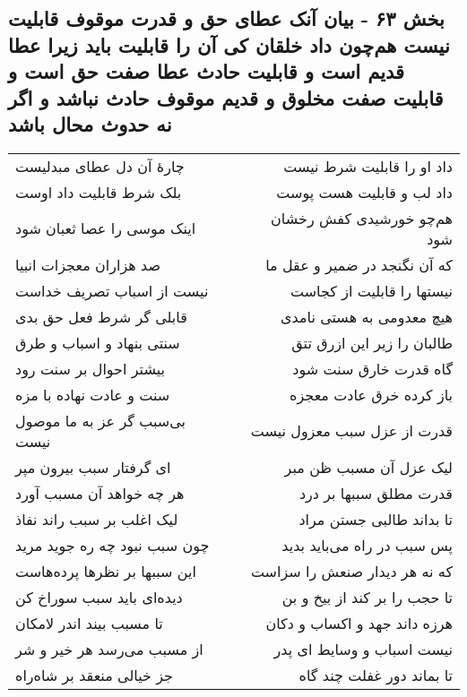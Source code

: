 \begin{center}
\section*{بخش ۶۳ - بیان آنک عطای حق و قدرت موقوف قابلیت نیست هم‌چون داد خلقان کی آن را قابلیت باید  زیرا عطا قدیم است و قابلیت حادث عطا صفت حق است و قابلیت صفت مخلوق و قدیم موقوف حادث نباشد و اگر نه حدوث محال باشد}
\label{sec:sh063}
\begin{longtable}{l p{0.5cm} r}
چارهٔ آن دل عطای مبدلیست
&&
داد او را قابلیت شرط نیست
\\
بلک شرط قابلیت داد اوست
&&
داد لب و قابلیت هست پوست
\\
اینک موسی را عصا ثعبان شود
&&
هم‌چو خورشیدی کفش رخشان شود
\\
صد هزاران معجزات انبیا
&&
که آن نگنجد در ضمیر و عقل ما
\\
نیست از اسباب تصریف خداست
&&
نیستها را قابلیت از کجاست
\\
قابلی گر شرط فعل حق بدی
&&
هیچ معدومی به هستی نامدی
\\
سنتی بنهاد و اسباب و طرق
&&
طالبان را زیر این ازرق تتق
\\
بیشتر احوال بر سنت رود
&&
گاه قدرت خارق سنت شود
\\
سنت و عادت نهاده با مزه
&&
باز کرده خرق عادت معجزه
\\
بی‌سبب گر عز به ما موصول نیست
&&
قدرت از عزل سبب معزول نیست
\\
ای گرفتار سبب بیرون مپر
&&
لیک عزل آن مسبب ظن مبر
\\
هر چه خواهد آن مسبب آورد
&&
قدرت مطلق سببها بر درد
\\
لیک اغلب بر سبب راند نفاذ
&&
تا بداند طالبی جستن مراد
\\
چون سبب نبود چه ره جوید مرید
&&
پس سبب در راه می‌باید بدید
\\
این سببها بر نظرها پرده‌هاست
&&
که نه هر دیدار صنعش را سزاست
\\
دیده‌ای باید سبب سوراخ کن
&&
تا حجب را بر کند از بیخ و بن
\\
تا مسبب بیند اندر لامکان
&&
هرزه داند جهد و اکساب و دکان
\\
از مسبب می‌رسد هر خیر و شر
&&
نیست اسباب و وسایط ای پدر
\\
جز خیالی منعقد بر شاه‌راه
&&
تا بماند دور غفلت چند گاه
\\
\end{longtable}
\end{center}
